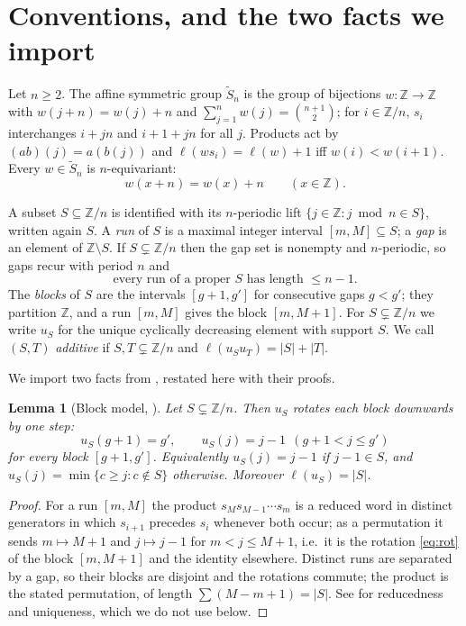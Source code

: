 \documentclass[11pt]{article}
\newtheorem{lem}[thm]{Lemma}
\theoremstyle{definition}
\newcommand{\Z}{\mathbb{Z}}
\newcommand{\Saff}{\widetilde{S}_{n}}
\begin{document}
\section{Conventions, and the two facts we import}\label{sec:conv}

Let $n\ge2$. The affine symmetric group $\Saff$ is the group of bijections $w:\Z\to\Z$ with
$w(j+n)=w(j)+n$ and $\sum_{j=1}^{n}w(j)=\binom{n+1}{2}$; for $i\in\Z/n$, $s_i$ interchanges
$i+jn$ and $i+1+jn$ for all $j$. Products act by $(ab)(j)=a(b(j))$ and
$\ell(ws_i)=\ell(w)+1$ iff $w(i)<w(i+1)$. Every $w\in\Saff$ is $n$-equivariant:
\begin{equation}\label{eq:equiv}
  w(x+n)=w(x)+n\qquad(x\in\Z).
\end{equation}

A subset $S\subseteq\Z/n$ is identified with its $n$-periodic lift $\{j\in\Z: j\bmod n\in S\}$,
written again $S$. A \emph{run} of $S$ is a maximal integer interval $[m,M]\subseteq S$; a
\emph{gap} is an element of $\Z\setminus S$. If $S\subsetneq\Z/n$ then the gap set is nonempty
and $n$-periodic, so gaps recur with period $n$ and
\begin{equation}\label{eq:runlen}
  \text{every run of a proper }S\text{ has length }\le n-1 .
\end{equation}
The \emph{blocks} of $S$ are the intervals $[g+1,g']$ for consecutive gaps $g<g'$; they
partition $\Z$, and a run $[m,M]$ gives the block $[m,M+1]$. For $S\subsetneq\Z/n$ we write
$u_S$ for the unique cyclically decreasing element with support $S$. We call $(S,T)$
\emph{additive} if $S,T\subsetneq\Z/n$ and $\ell(u_Su_T)=|S|+|T|$.

We import two facts from \cite[Lems.~2.2, 2.3]{Clio2}, restated here with their proofs.

\begin{lem}[Block model, {\cite[Lem.~2.2]{Clio2}}]\label{lem:blocks}
Let $S\subsetneq\Z/n$. Then $u_S$ rotates each block downwards by one step:
\begin{equation}\label{eq:rot}
  u_S(g+1)=g',\qquad u_S(j)=j-1\ \ (g+1<j\le g')
\end{equation}
for every block $[g+1,g']$. Equivalently $u_S(j)=j-1$ if $j-1\in S$, and
$u_S(j)=\min\{c\ge j: c\notin S\}$ otherwise. Moreover $\ell(u_S)=|S|$.
\end{lem}

\begin{proof}
For a run $[m,M]$ the product $s_Ms_{M-1}\cdots s_m$ is a reduced word in distinct generators
in which $s_{i+1}$ precedes $s_i$ whenever both occur; as a permutation it sends $m\mapsto M+1$
and $j\mapsto j-1$ for $m<j\le M+1$, i.e.\ it is the rotation \eqref{eq:rot} of the block
$[m,M+1]$ and the identity elsewhere. Distinct runs are separated by a gap, so their blocks are
disjoint and the rotations commute; the product is the stated permutation, of length
$\sum(M-m+1)=|S|$. See \cite[Lem.~2.2]{Clio2} for reducedness and uniqueness, which we do not
use below.
\end{proof}
\end{document}
